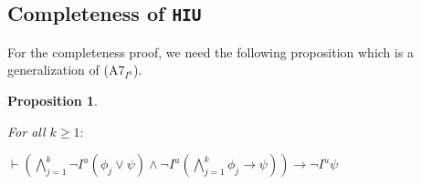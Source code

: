 \documentclass{article}
\newtheorem{prop}{Proposition}
\begin{document}
\subsection{Completeness of \texttt{HIU}}
\label{appHIUcomplete}

For the completeness proof, we need the following proposition which is a generalization of (A7$_{I^{u}}$).

\begin{prop}
\label{genA7IU}

For all $k \geq 1:$

\begin{center}

$\vdash (\bigwedge^{k}_{j=1} \neg I^{u} ( \phi_{j} \vee \psi) \wedge  \neg I^{u} (\bigwedge^{k}_{j=1}\phi_{j} \rightarrow \psi)) \rightarrow \neg I^{u} \psi$

\end{center}

\end{prop}
\end{document}
